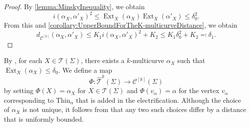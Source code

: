 \documentclass[a4paper,11pt]{amsart}
\numberwithin{equation}{section}
\theoremstyle{definition}
\newcommand{\Teich}{\mathcal{T}}
\newcommand{\elTeich}{\hat{\mathcal{T}}}
\DeclareMathOperator{\Ext}{Ext}
\newcommand{\Thin}{\mathrm{Thin}}
\newcommand{\multicurve}[1]{\mathcal{C}^{[#1]}}
\begin{document}
\begin{proof}
    By \cref{lemma:MinskyInequality}, we obtain 
    \begin{equation*}
        i(\alpha_X,\alpha'_X)^2\leq\Ext_X(\alpha_X)\Ext_X(\alpha'_X) \leq \delta_0^2. 
    \end{equation*}
    From this and \cref{corollary:UpperBoundForTheK-multicurveDistance}, we obtain 
    \begin{equation*}
        d_{\multicurve{k}}(\alpha_X,\alpha'_X)\leq K_1i(\alpha_X,\alpha'_X)^2+K_2\leq K_1\delta_0^2+K_2\eqqcolon \delta_1.
    \end{equation*} 
\end{proof}

By , for each
$X \in \Teich(\Sigma)$, there exists a $k$-multicurve
$\alpha_X$ such that $\Ext_X(\alpha_X) \le \delta_0$.
We define a map
\begin{equation*}
    \Phi \colon \elTeich^k(\Sigma) \to \multicurve{k}(\Sigma)
\end{equation*}
by setting $\Phi(X) = \alpha_X$ for $X \in \Teich(\Sigma)$ and
$\Phi(v_\alpha) = \alpha$ for the vertex $v_\alpha$ corresponding to
$\Thin_\alpha$ that is added in the electrification.
Although the choice of $\alpha_X$ is not unique, it follows from
 that any two such choices
differ by a distance that is uniformly bounded.
\end{document}
